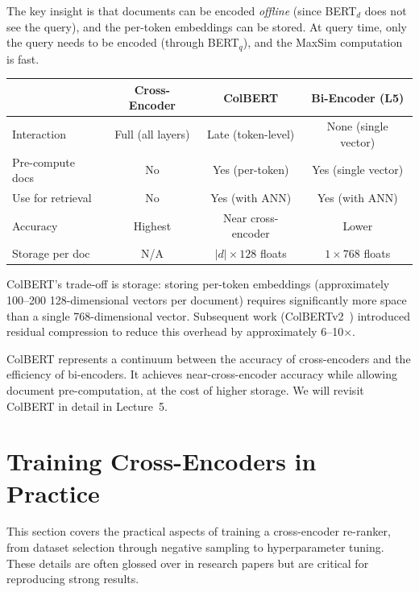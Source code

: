 \documentclass[11pt,a4paper]{article}
\theoremstyle{definition}
\theoremstyle{plain}
\begin{document}
The key insight is that documents can be encoded \emph{offline} (since BERT$_d$ does not see the query), and the per-token embeddings can be stored. At query time, only the query needs to be encoded (through BERT$_q$), and the MaxSim computation is fast.

\begin{center}
\small
\begin{tabular}{lccc}
\toprule
& \textbf{Cross-Encoder} & \textbf{ColBERT} & \textbf{Bi-Encoder (L5)} \\
\midrule
Interaction & Full (all layers) & Late (token-level) & None (single vector) \\
Pre-compute docs & No & Yes (per-token) & Yes (single vector) \\
Use for retrieval & No & Yes (with ANN) & Yes (with ANN) \\
Accuracy & Highest & Near cross-encoder & Lower \\
Storage per doc & N/A & $|d| \times 128$ floats & $1 \times 768$ floats \\
\bottomrule
\end{tabular}
\end{center}

ColBERT's trade-off is storage: storing per-token embeddings (approximately 100--200 128-dimensional vectors per document) requires significantly more space than a single 768-dimensional vector. Subsequent work (ColBERTv2~\cite{santhanam2022colbertv2}) introduced residual compression to reduce this overhead by approximately 6--10$\times$.

\begin{keytakeaway}
ColBERT represents a continuum between the accuracy of cross-encoders and the efficiency of bi-encoders. It achieves near-cross-encoder accuracy while allowing document pre-computation, at the cost of higher storage. We will revisit ColBERT in detail in Lecture~5.
\end{keytakeaway}


\section{Training Cross-Encoders in Practice}
\label{sec:training}

This section covers the practical aspects of training a cross-encoder re-ranker, from dataset selection through negative sampling to hyperparameter tuning. These details are often glossed over in research papers but are critical for reproducing strong results.
\end{document}
